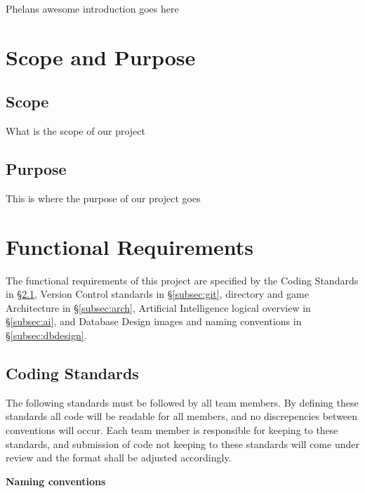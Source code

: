 \documentclass[12pt]{IEEEtran}
\begin{document}
	Phelans awesome introduction goes here

\section{Scope and Purpose}
\label{sec:scope}

\subsection{Scope}
\label{subsec:scope}

What is the scope of our project

\subsection{Purpose}
\label{subsec:purpose}

This is where the purpose of our project goes

\section{Functional Requirements}
\label{sec:funcReq}
	The functional requirements of this project are specified by the Coding Standards in \S \ref{subsec:coding}, Version Control standards in \S \ref{subsec:git}, directory and game Architecture in \S 				\ref{subsec:arch}, Artificial Intelligence logical overview in \S \ref{subsec:ai}, and Database Design images and naming conventions in \S \ref{subsec:dbdesign}.


\subsection{Coding Standards}
\label{subsec:coding}

	The following standards must be followed by all team members. By defining these standards all code will be readable for all members, and no discrepencies between conventions will occur. Each team member is 		responsible for keeping to these standards, and submission of code not keeping to these standards will come under review and the format shall be adjusted accordingly. 

	\bfseries Naming conventions \mdseries
\end{document}
